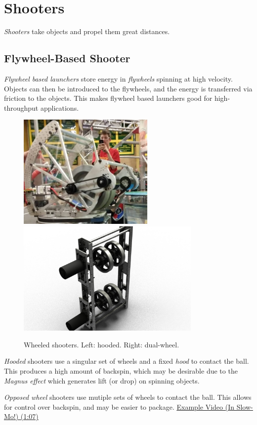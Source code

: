 \section{Shooters}
\textit{Shooters} take objects and propel them great distances.
\subsection{Flywheel-Based Shooter}
\textit{Flywheel based launchers} store energy in \textit{flywheels} spinning at high velocity. Objects can then be introduced to the flywheels, and the energy is transferred via friction to the objects. This makes flywheel based launchers good for high-throughput applications.

\begin{figure}[H]
	\includegraphics[height=2.2in]{imgs/shooter_hooded.png}
	\includegraphics[height=2.2in]{imgs/shooter_dualwheel.jpeg}
	\caption{Wheeled shooters. Left: hooded. Right: dual-wheel.}
\end{figure}

\textit{Hooded} shooters use a singular set of wheels and a fixed \textit{hood} to contact the ball. This produces a high amount of backspin, which may be desirable due to the \textit{Magnus effect} which generates lift (or drop) on spinning objects.

\textit{Opposed wheel} shooters use mutiple sets of wheels to contact the ball. This allows for control over backspin, and may be easier to package. \href{https://youtu.be/pgMU_AxzxAE?t=67}{\color{red}\underline{Example Video (In Slow-Mo!) (1:07)}}

